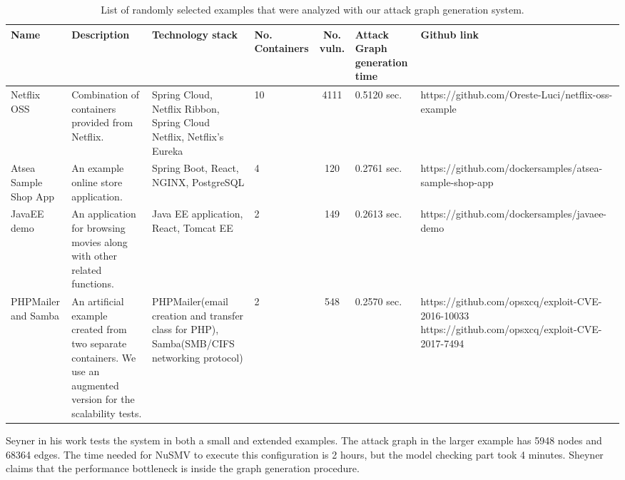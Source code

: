 \documentclass[letterpaper, 10 pt, conference]{ieeeconf}  %
\begin{document}
\begin{table}
	\begin{center}
		\begin{tabular}{ |p{20mm}|p{25mm}|p{20mm}|p{10mm}|c|p{15mm}|p{45mm}| } 
			\hline
			Name & Description & Technology stack & No. Containers & No. vuln. & Attack Graph generation time & Github link \\\hline 
			
			Netflix OSS & Combination of containers provided from Netflix. & Spring Cloud, Netflix Ribbon, Spring Cloud Netflix, Netflix's Eureka & 10 & 4111 & 0.5120 sec. & https://github.com/Oreste-Luci/netflix-oss-example \\\hline
			
			Atsea Sample Shop App & An example online store application. & Spring Boot, React, NGINX, PostgreSQL & 4 & 120 & 0.2761 sec. & https://github.com/dockersamples/atsea-sample-shop-app \\\hline
			
			JavaEE demo & An application for browsing movies along with other related functions. & Java EE application, React, Tomcat EE & 2 & 149 & 0.2613 sec. & https://github.com/dockersamples/javaee-demo \\\hline
			
			PHPMailer and Samba & An artificial example created from two separate containers. We use an augmented version for the scalability tests. & PHPMailer(email creation and transfer class for PHP), Samba(SMB/CIFS networking protocol) & 2 & 548 & 0.2570 sec. & https://github.com/opsxcq/exploit-CVE-2016-10033
			https://github.com/opsxcq/exploit-CVE-2017-7494 \\\hline
			
			
			\hline
		\end{tabular}
	\end{center}
	
	\caption{List of randomly selected examples that were analyzed with our attack graph generation system.}
	\label{table_technologies}
	
\end{table}

Seyner in his work tests the system in both a small and extended examples.\cite{sheyner} The attack graph in the larger example has 5948 nodes and 68364 edges. The time needed for NuSMV to execute this configuration is 2 hours, but the model checking part took 4 minutes. Sheyner claims that the performance bottleneck is inside the graph generation procedure. 
\end{document}

